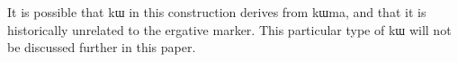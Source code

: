 \documentclass[oldfontcommands,oneside,a4paper,11pt]{article}
\newcommand{\ipa}[1]{{\phon #1}} %
\begin{document}
 
%    
%    
% 
%
% 
% 
%
%

  It is possible that \ipa{kɯ} in this construction derives from \ipa{kɯma}, and that it is historically unrelated to the ergative marker. This particular type of  \ipa{kɯ} will not be discussed further in this paper.
\end{document}
